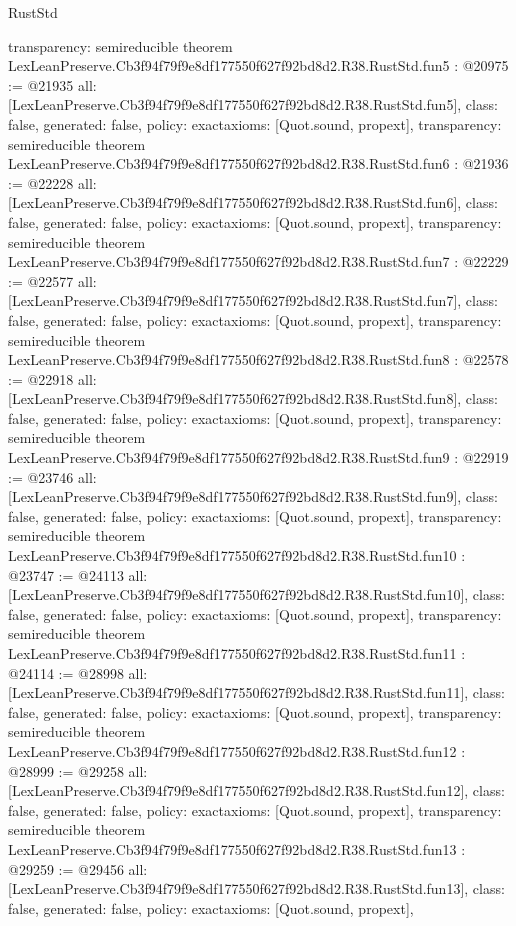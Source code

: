 \begin{lexlean}{RustStd}
\begin{coremodule}
{  transparency: semireducible
}
theorem LexLeanPreserve.Cb3f94f79f9e8df177550f627f92bd8d2.R38.RustStd.fun5 : @20975 := @21935 {
  all: [LexLeanPreserve.Cb3f94f79f9e8df177550f627f92bd8d2.R38.RustStd.fun5],
  class: false,
  generated: false,
  policy: exact{axioms: [Quot.sound, propext]},
  transparency: semireducible
}
theorem LexLeanPreserve.Cb3f94f79f9e8df177550f627f92bd8d2.R38.RustStd.fun6 : @21936 := @22228 {
  all: [LexLeanPreserve.Cb3f94f79f9e8df177550f627f92bd8d2.R38.RustStd.fun6],
  class: false,
  generated: false,
  policy: exact{axioms: [Quot.sound, propext]},
  transparency: semireducible
}
theorem LexLeanPreserve.Cb3f94f79f9e8df177550f627f92bd8d2.R38.RustStd.fun7 : @22229 := @22577 {
  all: [LexLeanPreserve.Cb3f94f79f9e8df177550f627f92bd8d2.R38.RustStd.fun7],
  class: false,
  generated: false,
  policy: exact{axioms: [Quot.sound, propext]},
  transparency: semireducible
}
theorem LexLeanPreserve.Cb3f94f79f9e8df177550f627f92bd8d2.R38.RustStd.fun8 : @22578 := @22918 {
  all: [LexLeanPreserve.Cb3f94f79f9e8df177550f627f92bd8d2.R38.RustStd.fun8],
  class: false,
  generated: false,
  policy: exact{axioms: [Quot.sound, propext]},
  transparency: semireducible
}
theorem LexLeanPreserve.Cb3f94f79f9e8df177550f627f92bd8d2.R38.RustStd.fun9 : @22919 := @23746 {
  all: [LexLeanPreserve.Cb3f94f79f9e8df177550f627f92bd8d2.R38.RustStd.fun9],
  class: false,
  generated: false,
  policy: exact{axioms: [Quot.sound, propext]},
  transparency: semireducible
}
theorem LexLeanPreserve.Cb3f94f79f9e8df177550f627f92bd8d2.R38.RustStd.fun10 : @23747 := @24113 {
  all: [LexLeanPreserve.Cb3f94f79f9e8df177550f627f92bd8d2.R38.RustStd.fun10],
  class: false,
  generated: false,
  policy: exact{axioms: [Quot.sound, propext]},
  transparency: semireducible
}
theorem LexLeanPreserve.Cb3f94f79f9e8df177550f627f92bd8d2.R38.RustStd.fun11 : @24114 := @28998 {
  all: [LexLeanPreserve.Cb3f94f79f9e8df177550f627f92bd8d2.R38.RustStd.fun11],
  class: false,
  generated: false,
  policy: exact{axioms: [Quot.sound, propext]},
  transparency: semireducible
}
theorem LexLeanPreserve.Cb3f94f79f9e8df177550f627f92bd8d2.R38.RustStd.fun12 : @28999 := @29258 {
  all: [LexLeanPreserve.Cb3f94f79f9e8df177550f627f92bd8d2.R38.RustStd.fun12],
  class: false,
  generated: false,
  policy: exact{axioms: [Quot.sound, propext]},
  transparency: semireducible
}
theorem LexLeanPreserve.Cb3f94f79f9e8df177550f627f92bd8d2.R38.RustStd.fun13 : @29259 := @29456 {
  all: [LexLeanPreserve.Cb3f94f79f9e8df177550f627f92bd8d2.R38.RustStd.fun13],
  class: false,
  generated: false,
  policy: exact{axioms: [Quot.sound, propext]},
}
\end{coremodule}
\end{lexlean}
